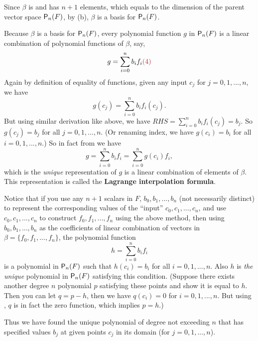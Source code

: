 Since \(\beta\) is \LID{} and has \(n + 1\) elements, which equals to the dimension of the parent vector space \(\textsf{P}_n(F)\), by (b), \(\beta\) is a basis for \(\textsf{P}_n(F)\).

Because \(\beta\) is a basis for \(\textsf{P}_n(F)\), every polynomial function \(g\) in \(\textsf{P}_n(F)\) is a linear combination of polynomial functions of \(\beta\), say,
\[
    g = \sum_{i = 0}^n b_i f_i \MAROON{(4)}
\]
Again by definition of equality of functions, given any input \(c_j\) for \(j = 0, 1, ..., n\), we have
\[
    g(c_j) = \sum_{i = 0}^n b_i f_i(c_j).
\]
But using similar derivation like above, we have \(RHS = \sum_{i = 0}^n b_i f_i(c_j) = b_j\).
So \(g(c_j) = b_j\) for all \(j = 0, 1, ..., n\).
(Or renaming index, we have \(g(c_i) = b_i\) for all \(i = 0, 1, ..., n\).)
So in fact from  we have
\[
    g = \sum_{i = 0}^n b_i f_i = \sum_{i = 0}^n g(c_i) f_i,
\]
which is the \emph{unique} representation of \(g\) is a linear combination of elements of \(\beta\).
This representation is called the \textbf{Lagrange interpolation formula}.

Notice that if you use any \(n + 1\) scalars in \(F\), \(b_0, b_1, ..., b_n\) (not necessarily distinct) to represent the corresponding values of the ``input'' \(c_0, c_1, ..., c_n\),
and use \(c_0, c_1, ..., c_n\) to construct \(f_0, f_1, ..., f_n\) using the above method,
then using \(b_0, b_1, ..., b_n\) as the coefficients of linear combination of vectors in \(\beta = \{ f_0, f_1, ..., f_n \}\), the polynomial function
\[
    h = \sum_{i = 0}^n b_i f_i
\]
is a polynomial in \(\textsf{P}_n(F)\) such that \(h(c_i) = b_i\) for all \(i = 0, 1, ..., n\).
Also \(h\) is \emph{the unique} polynomial in \(\textsf{P}_n(F)\) satisfying this condition.
(Suppose there exists another degree \(n\) polynomial \(p\) satisfying these points and show it is equal to \(h\).
Then you can let \(q = p - h\), then we have \(q(c_i) = 0\) for \(i = 0, 1, ..., n\).
But using  , \(q\) is in fact the zero function, which implies \(p = h\).)

Thus we have found the unique polynomial of degree not exceeding \(n\) that has specified values \(b_j\) at given points \(c_j\) in its domain (for \(j = 0, 1, ..., n\)).

